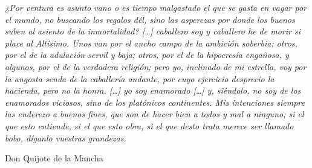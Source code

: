 \documentclass[12pt,a4paper]{book}
\theoremstyle{definition} \newtheorem{defn}[thm]{Definition}
\theoremstyle{definition} \newtheorem{ejemplo}[thm]{Example}
\theoremstyle{remark} \newtheorem{rem}[thm]{Remark}
\begin{document}

\newpage\null\thispagestyle{empty}
\newpage\null\thispagestyle{empty}
\epigraph{\textit{¿Por ventura es asunto vano o es tiempo malgastado el que se gasta en vagar por el mundo, no buscando los regalos dél, sino las
asperezas por donde los buenos suben al asiento de la inmortalidad? [\dots] caballero soy y caballero he de morir si place al Altísimo. Unos van por el
ancho campo de la ambición soberbia; otros, por el de la adulación servil y baja; otros, por el de la hipocresía engañosa, y algunos, por el de la 
verdadera religión; pero yo, inclinado de mi estrella, voy por la angosta senda de la caballería andante, por cuyo ejercicio desprecio la hacienda, pero
no la honra. [\dots] yo soy enamorado [\dots] y, siéndolo, no soy de los enamorados viciosos, sino de los platónicos continentes. Mis intenciones siempre
las enderezo a buenos fines, que son de hacer bien a todos y mal a ninguno; si el que esto entiende, si el que esto obra, si el que desto trata merece
ser llamado bobo, díganlo vuestras grandezas.}}{Don Quijote de la Mancha}

\newpage\null\thispagestyle{empty}
\tableofcontents
{}

\newpage\null\thispagestyle{empty}
\end{document}
